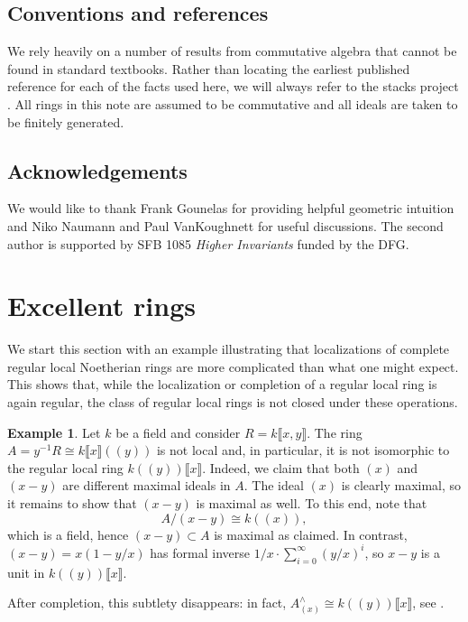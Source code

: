 \documentclass[oneside]{amsart}
\theoremstyle{definition}
\newtheorem{ex}[thm]{Example}
\theoremstyle{remark}
\theoremstyle{theorem}
\numberwithin{equation}{section}
\begin{document}
\subsection*{Conventions and references}

We rely heavily on a number of results from commutative algebra that cannot be found in standard textbooks. Rather than locating the earliest published reference for each of the facts used here, we will always refer to the stacks project \cite{stacks-project}. All rings in this note are assumed to be commutative and all ideals are taken to be finitely generated. 

\subsection*{Acknowledgements}

We would like to thank Frank Gounelas for providing helpful geometric intuition and Niko Naumann and Paul VanKoughnett for useful discussions. The second author is supported by SFB 1085 \emph{Higher Invariants} funded by the DFG.


\section{Excellent rings}

We start this section with an example illustrating that localizations of complete regular local Noetherian rings are more complicated than what one might expect. This shows that, while the localization or completion of a regular local ring is again regular, the class of regular local rings is not closed under these operations. 

\begin{ex}
Let $k$ be a field and consider $R = k\llbracket x,y \rrbracket$. The ring $A = y^{-1}R \cong k\llbracket x \rrbracket (\!(y)\!)$ is not local and, in particular, it is not isomorphic to the regular local ring $k(\!(y)\!)\llbracket x \rrbracket$. Indeed, we claim that both $(x)$ and $(x-y)$ are different maximal ideals in $A$. The ideal $(x)$ is clearly maximal, so it remains to show that $(x-y)$ is maximal as well. To this end, note that 
\[
A/(x-y) \cong k(\!(x)\!),
\]
which is a field, hence $(x-y) \subset A$ is maximal as claimed. In contrast, $(x-y) = x(1-y/x)$ has formal inverse $1/x \cdot \sum_{i=0}^{\infty}(y/x)^i$, so $x-y$ is a unit in $k(\!(y)\!)\llbracket x \rrbracket$.

After completion, this subtlety disappears: in fact, $A_{(x)}^{\wedge} \cong k(\!(y)\!)\llbracket x \rrbracket$, see \cite[B.2]{piperings}.
\end{ex}
\end{document}
